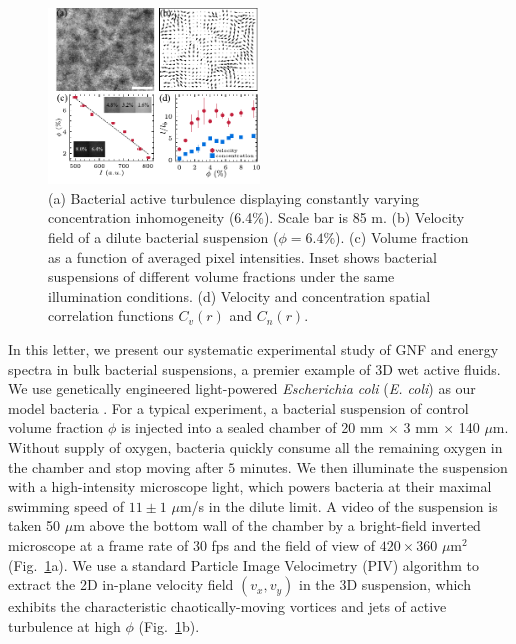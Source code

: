 \documentclass[twocolumn,aps,prl,amsmath,amssymb,longbibliography]{revtex4-2}
\begin{document}
\begin{figure}[ht]
\begin{center}
\includegraphics[width=0.5\textwidth]{Figures/experiment/v1.pdf}
\caption[Experimental details]
{
(a) Bacterial active turbulence displaying constantly varying concentration inhomogeneity (6.4\%). Scale bar is 85 \textmu m.
(b) Velocity field of a dilute bacterial suspension ($\phi=6.4\%$).
(c) Volume fraction as a function of averaged pixel intensities. Inset shows bacterial suspensions of different volume fractions under the same illumination conditions.
(d) Velocity and concentration spatial correlation functions $C_{v}(r)$ and $C_{n}(r)$.
}
\label{fig:experiment}
\end{center}
\end{figure}

In this letter, we present our systematic experimental study of GNF and energy spectra in bulk bacterial suspensions, a premier example of 3D wet active fluids. We use genetically engineered light-powered \textit{Escherichia coli} (\textit{E. coli}) as our model bacteria \cite{Liu2020}.
For a typical experiment, a bacterial suspension of control volume fraction $\phi$ is injected into a sealed chamber of 20 mm $\times$ 3 mm $\times$ 140 $\mu$m.
Without supply of oxygen, bacteria quickly consume all the remaining oxygen in the chamber and stop moving after $5$ minutes.
We then illuminate the suspension with a high-intensity microscope light, which powers bacteria at their maximal swimming speed of $11 \pm 1$ $\mu$m/s in the dilute limit.
A video of the suspension is taken 50 $\mu$m above the bottom wall of the chamber by a bright-field inverted microscope at a frame rate of $30$ fps and the field of view of $420 \times 360$ $\mu$m$^2$ (Fig.~\ref{fig:experiment}a).
We use a standard Particle Image Velocimetry (PIV) algorithm to extract the 2D in-plane velocity field $(v_x,v_y)$ in the 3D suspension, which exhibits the characteristic chaotically-moving vortices and jets of active turbulence at high $\phi$ (Fig.~\ref{fig:experiment}b).
\end{document}
